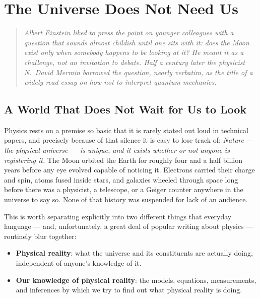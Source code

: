 
\chapter{The Universe Does Not Need Us}
\label{ch:reality-and-law}

\begin{quotation}
\noindent\itshape
Albert Einstein liked to press the point on younger colleagues with a
question that sounds almost childish until one sits with it: does the Moon
exist only when somebody happens to be looking at it? He meant it as a
challenge, not an invitation to debate. Half a century later the physicist
N.\ David Mermin borrowed the question, nearly verbatim, as the title of a
widely read essay on how \emph{not} to interpret quantum mechanics.
\end{quotation}

\section{A World That Does Not Wait for Us to Look}
\label{sec:world-independent}

Physics rests on a premise so basic that it is rarely stated out loud in
technical papers, and precisely because of that silence it is easy to lose
track of: \emph{Nature --- the physical universe --- is unique, and it
exists whether or not anyone is registering it.} The Moon orbited the Earth
for roughly four and a half billion years before any eye evolved capable of
noticing it. Electrons carried their charge and spin, atoms fused inside
stars, and galaxies wheeled through space long before there was a physicist,
a telescope, or a Geiger counter anywhere in the universe to say so. None of
that history was suspended for lack of an audience.

This is worth separating explicitly into two different things that everyday
language --- and, unfortunately, a great deal of popular writing about
physics --- routinely blur together:

\begin{itemize}
  \item \textbf{Physical reality}: what the universe and its constituents
  are actually doing, independent of anyone's knowledge of it.
  \item \textbf{Our knowledge of physical reality}: the models, equations,
  measurements, and inferences by which we try to find out what physical
  reality is doing.
\end{itemize}

